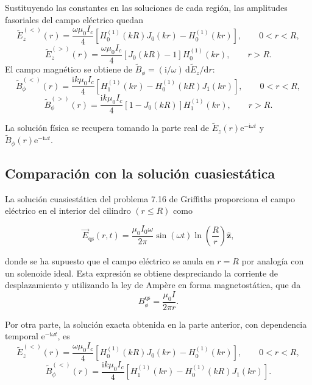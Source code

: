 \documentclass{article}
\numberwithin{equation}{section}
\newcommand{\e}{\mathrm{e}}
\newcommand{\iu}{\mathrm{i}}
\newcommand{\ud}{\mathrm{d}}
\newcommand{\hz}{\hat{\mathbf z}}
\begin{document}
Sustituyendo las constantes en las soluciones de cada región, las amplitudes fasoriales del campo eléctrico quedan
\begin{equation}\tag{31}\label{eq:31}
    \widetilde E_z^{(<)}(r)
    =\frac{\omega\mu_0 I_c}{4}
    \left[H_0^{(1)}(kR)J_0(kr)-H_0^{(1)}(kr)\right],
    \qquad 0<r<R,
\end{equation}
\begin{equation}\tag{32}\label{eq:32}
    \widetilde E_z^{(>)}(r)
    =\frac{\omega\mu_0 I_c}{4}
    \left[J_0(kR)-1\right]H_0^{(1)}(kr),
    \qquad r>R.
\end{equation}
El campo magnético se obtiene de $\widetilde B_\phi=(\iu/\omega)\,\ud\widetilde E_z/\ud r$:
\begin{equation}\tag{33}\label{eq:33}
    \widetilde B_{\phi}^{(<)}(r)
    =\frac{\iu k\mu_0 I_c}{4}
    \left[H_1^{(1)}(kr)-H_0^{(1)}(kR)J_1(kr)\right],
    \qquad 0<r<R,
\end{equation}
\begin{equation}\tag{34}\label{eq:34}
    \widetilde B_{\phi}^{(>)}(r)
    =\frac{\iu k\mu_0 I_c}{4}
    \left[1-J_0(kR)\right]H_1^{(1)}(kr),
    \qquad r>R.
\end{equation}

La solución física se recupera tomando la parte real de $\widetilde E_z(r)\e^{-\iu\omega t}$ y $\widetilde B_{\phi}(r)\e^{-\iu\omega t}$.

\subsection{Comparación con la solución cuasiestática}

La solución cuasiestática del problema 7.16 de Griffiths proporciona el campo eléctrico en el interior del cilindro $(r\le R)$ como

\begin{equation*}
    \vec E_{\text{qs}}(r,t)=\frac{\mu_0 I_0\omega}{2\pi}\sin(\omega t)\ln\left(\frac{R}{r}\right)\hz,
\end{equation*}

donde se ha supuesto que el campo eléctrico se anula en $r=R$ por analogía con un solenoide ideal. Esta expresión se obtiene despreciando la corriente de desplazamiento y utilizando la ley de Ampère en forma magnetostática, que da
\begin{equation*}
    B_{\phi}^{\text{qs}}=\frac{\mu_0 I}{2\pi r}.
\end{equation*}

Por otra parte, la solución exacta obtenida en la parte anterior, con dependencia temporal $\e^{-\iu\omega t}$, es
\begin{equation}\tag{35}\label{eq:35}
    \widetilde E_z^{(<)}(r)=\frac{\omega\mu_0 I_c}{4}
    \left[H_0^{(1)}(kR)J_0(kr)-H_0^{(1)}(kr)\right],
    \qquad 0<r<R,
\end{equation}
\begin{equation}\tag{36}\label{eq:36}
    \widetilde B_{\phi}^{(<)}(r)=\frac{\iu k\mu_0 I_c}{4}
    \left[H_1^{(1)}(kr)-H_0^{(1)}(kR)J_1(kr)\right].
\end{equation}
\end{document}
